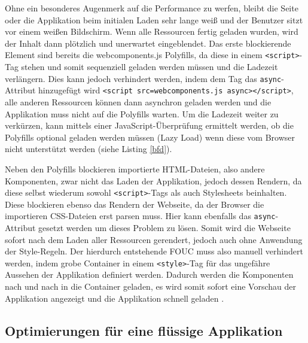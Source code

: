 Ohne ein besonderes Augenmerk auf die Performance zu werfen, bleibt die Seite oder die Applikation beim initialen Laden sehr lange weiß und der Benutzer sitzt vor einem weißen Bildschirm. Wenn alle Ressourcen fertig geladen wurden, wird der Inhalt dann plötzlich und unerwartet eingeblendet. Das erste blockierende Element sind bereits die webcomponents.js Polyfills, da diese in einem \texttt{\textless{}script\textgreater{}}-Tag stehen und somit sequenziell geladen werden müssen und die Ladezeit verlängern. Dies kann jedoch verhindert werden, indem dem Tag das \texttt{async}-Attribut hinzugefügt wird \texttt{\textless{}script\ src=\dq webcomponents.js\dq\ async\textgreater{}\textless{}/script\textgreater{}}, alle anderen Ressourcen können dann asynchron geladen werden und die Applikation muss nicht auf die Polyfills warten. Um die Ladezeit weiter zu verkürzen, kann mittels einer JavaScript-Überprüfung ermittelt werden, ob die Polyfills optional geladen werden müssen (Lazy Load) wenn diese vom Browser nicht unterstützt werden (siehe Listing \ref{bfd}).



Neben den Polyfills blockieren importierte \ac{HTML}-Dateien, also andere Komponenten, zwar nicht das Laden der Applikation, jedoch dessen Rendern, da diese selbst wiederum sowohl \texttt{\textless{}script\textgreater{}}-Tags als auch Stylesheets beinhalten. Diese blockieren ebenso das Rendern der Webseite, da der Browser die importieren \ac{CSS}-Dateien erst parsen muss. Hier kann ebenfalls das \texttt{async}-Attribut gesetzt werden um dieses Problem zu lösen. Somit wird die Webseite sofort nach dem Laden aller Ressourcen gerendert, jedoch auch ohne Anwendung der Style-Regeln. Der hierdurch entstehende \ac{FOUC} muss also manuell verhindert werden, indem grobe Container in einem \texttt{\textless{}style\textgreater{}}-Tag für das ungefähre Aussehen der Applikation definiert werden. Dadurch werden die Komponenten nach und nach in die Container geladen, es wird somit sofort eine Vorschau der Applikation angezeigt und die Applikation schnell geladen \cite{citeulike:13915203}.


\subsection{Optimierungen für eine flüssige Applikation}\label{optimierungen-fuxfcr-eine-fluxfcssige-applikation}

